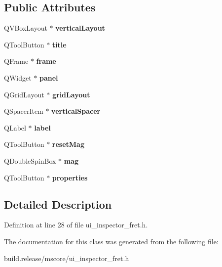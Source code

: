 \subsection*{Public Attributes}
\begin{DoxyCompactItemize}
\item 
\mbox{\label{class_ui___inspector_fret_diagram_a23d9ce0125366e916b905eae7875ddd0}} 
Q\+V\+Box\+Layout $\ast$ {\bfseries vertical\+Layout}
\item 
\mbox{\label{class_ui___inspector_fret_diagram_a48376e4a345f2d707f7a57295612dd1c}} 
Q\+Tool\+Button $\ast$ {\bfseries title}
\item 
\mbox{\label{class_ui___inspector_fret_diagram_a838962306ae8dacac30ce8e729880ba0}} 
Q\+Frame $\ast$ {\bfseries frame}
\item 
\mbox{\label{class_ui___inspector_fret_diagram_a34ba6d5b03fd39e3b2fc40f204f034f3}} 
Q\+Widget $\ast$ {\bfseries panel}
\item 
\mbox{\label{class_ui___inspector_fret_diagram_a9116e09cc3613fdc0fd14fac5f1ac41e}} 
Q\+Grid\+Layout $\ast$ {\bfseries grid\+Layout}
\item 
\mbox{\label{class_ui___inspector_fret_diagram_a557783c49ba0100b0e4e6fa569dbedeb}} 
Q\+Spacer\+Item $\ast$ {\bfseries vertical\+Spacer}
\item 
\mbox{\label{class_ui___inspector_fret_diagram_ab85f8e581946e48720c4515b2ea3925e}} 
Q\+Label $\ast$ {\bfseries label}
\item 
\mbox{\label{class_ui___inspector_fret_diagram_a6002c0de14b79623034566c72e446b04}} 
Q\+Tool\+Button $\ast$ {\bfseries reset\+Mag}
\item 
\mbox{\label{class_ui___inspector_fret_diagram_a9c0f80cf28a675db4230db52e8f88282}} 
Q\+Double\+Spin\+Box $\ast$ {\bfseries mag}
\item 
\mbox{\label{class_ui___inspector_fret_diagram_a3f0937292c8993d4c34b5204c0005bde}} 
Q\+Tool\+Button $\ast$ {\bfseries properties}
\end{DoxyCompactItemize}


\subsection{Detailed Description}


Definition at line 28 of file ui\+\_\+inspector\+\_\+fret.\+h.



The documentation for this class was generated from the following file\+:\begin{DoxyCompactItemize}
\item 
build.\+release/mscore/ui\+\_\+inspector\+\_\+fret.\+h\end{DoxyCompactItemize}
